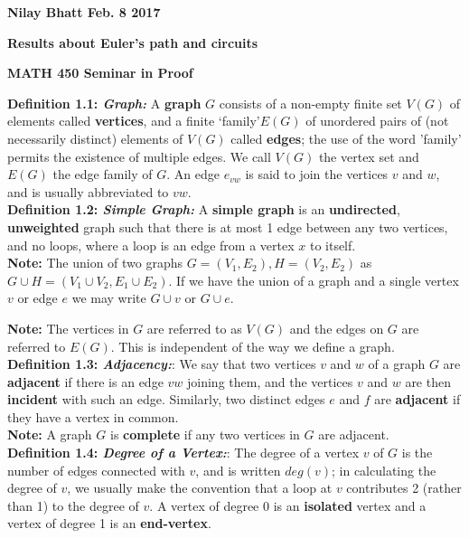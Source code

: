 \documentclass[12pt, fullpage]{article}
\begin{document}
\begin{flushleft}
\textbf{Nilay Bhatt Feb. 8 2017}		
\end{flushleft}
\begin{center}
	\textbf{Results about Euler's path and circuits}
\end{center}
\begin{center}
		
{\bf MATH 450 Seminar in Proof}
 \\
\end{center}
\textbf{Definition 1.1: \textit{Graph: }}A \textbf{graph} $G$ consists of a non-empty finite set $V(G)$ of elements called \textbf{vertices},
and a finite \lq family\rq $ E(G)$ of unordered pairs of (not necessarily distinct) elements
of $V(G)$ called \textbf{edges}; the use of the word 'family' permits the existence of multiple edges. We call $V(G)$ the vertex set and $E(G)$ the edge family of $G$. An edge $e_{vw}$ is said to join the vertices $v$ and $w$, and is usually abbreviated to $vw$. \\

\textbf{Definition 1.2: \textit{Simple Graph:}} A \textbf{simple graph} is an \textbf{undirected}, \textbf{unweighted} graph such that there is at most 1 edge between any two vertices, and no loops, where a loop is an edge from a vertex $x$ to itself.\\ \textbf{Note:} The union of two graphs $G = (V_1,E_2),H = (V_2,E_2)$ as $G\cup H = (V_1\cup V_2, E_1 \cup E_2)$. If we have the union of a graph and a single vertex $v$ or edge $e$ we may write $G\cup v$ or $G\cup e$.\newline

\textbf{Note:}	The vertices in $G$ are referred to as $V(G)$ and the edges on $G$ are referred to $E(G)$. This is independent of the way we define a graph.\\

\textbf{Definition 1.3: \textit{Adjacency:}}: We say that two vertices $v$ and $w$ of a graph $G$ are \textbf{adjacent} if there is an edge $vw$ joining
them, and the vertices $v$ and $w$ are then \textbf{incident} with such an edge. Similarly, two
distinct edges $e$ and $f$ are \textbf{adjacent} if they have a vertex in common.\\

\textbf{Note:} A graph $G$ is \textbf{complete} if any two vertices in $G$ are adjacent.\\

\textbf{Definition 1.4: \textit{Degree of a Vertex:}}: The degree of a vertex $v$ of $G$ is the number of edges connected with $v$, and is written
$deg(v)$; in calculating the degree of $v$, we usually make the convention that a loop at $v$
contributes 2 (rather than 1) to the degree of $v$. A vertex of degree 0 is an \textbf{isolated} vertex and a vertex of degree 1 is an \textbf{end-vertex}.\\
\end{document}
